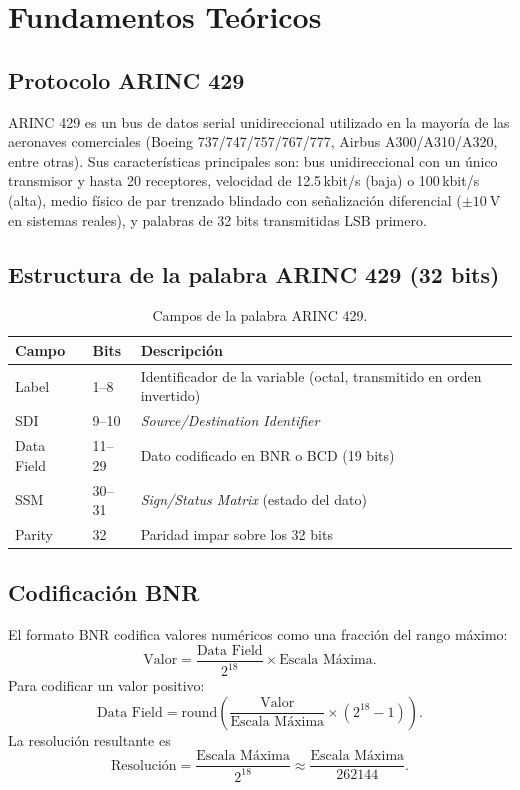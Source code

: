 \documentclass[11pt]{article}
\begin{document}
\section{Fundamentos Teóricos}

\subsection{Protocolo ARINC 429}
ARINC 429 es un bus de datos serial unidireccional utilizado en la mayoría de las
aeronaves comerciales (Boeing 737/747/757/767/777, Airbus A300/A310/A320, entre otras).
Sus características principales son: bus unidireccional con un único transmisor y hasta
20 receptores, velocidad de 12.5\,kbit/s (baja) o 100\,kbit/s (alta), medio físico de par
trenzado blindado con señalización diferencial ($\pm\SI{10}{\volt}$ en sistemas reales),
y palabras de 32 bits transmitidas LSB primero.

\subsection{Estructura de la palabra ARINC 429 (32 bits)}
\begin{table}[H]\centering
\caption{Campos de la palabra ARINC 429.}
\begin{tabular}{lll}
\toprule
Campo & Bits & Descripción \\
\midrule
Label & 1--8 & Identificador de la variable (octal, transmitido en orden invertido) \\
SDI & 9--10 & \emph{Source/Destination Identifier} \\
Data Field & 11--29 & Dato codificado en BNR o BCD (19 bits) \\
SSM & 30--31 & \emph{Sign/Status Matrix} (estado del dato) \\
Parity & 32 & Paridad impar sobre los 32 bits \\
\bottomrule
\end{tabular}
\end{table}

\subsection{Codificación BNR}
El formato BNR codifica valores numéricos como una fracción del rango máximo:
\begin{equation}
  \text{Valor} = \frac{\text{Data Field}}{2^{18}}\times\text{Escala Máxima}.
\end{equation}
Para codificar un valor positivo:
\begin{equation}
  \text{Data Field} = \text{round}\!\left(\frac{\text{Valor}}{\text{Escala Máxima}}\times(2^{18}-1)\right).
\end{equation}
La resolución resultante es
\begin{equation}
  \text{Resolución} = \frac{\text{Escala Máxima}}{2^{18}}\approx\frac{\text{Escala Máxima}}{262144}.
\end{equation}
\end{document}
